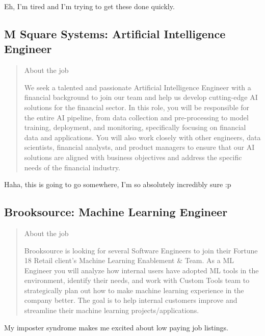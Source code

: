 \documentclass[
	letterpaper, %
	12pt, %
]{CSSullivanBusinessReport}
\begin{document}
Eh, I'm tired and I'm trying to get these done quickly.  


\subsection[M Square Systems]{M Square Systems: Artificial Intelligence Engineer}

\begin{quote}
	About the job
	
	We seek a talented and passionate Artificial Intelligence Engineer with a financial background to join our team and help us develop cutting-edge AI solutions for the financial sector. In this role, you will be responsible for the entire AI pipeline, from data collection and pre-processing to model training, deployment, and monitoring, specifically focusing on financial data and applications. You will also work closely with other engineers, data scientists, financial analysts, and product managers to ensure that our AI solutions are aligned with business objectives and address the specific needs of the financial industry.

\end{quote}

Haha, this is going to go somewhere, I'm so absolutely incredibly sure :p 


\subsection[Brooksource]{Brooksource: Machine Learning Engineer}

\begin{quote}
	About the job
	
	Brooksource is looking for several Software Engineers to join their Fortune 18 Retail client's Machine Learning Enablement \& Team. As a ML Engineer you will analyze how internal users have adopted ML tools in the environment, identify their needs, and work with Custom Tools team to strategically plan out how to make machine learning experience in the company better. The goal is to help internal customers improve and streamline their machine learning projects/applications. 

\end{quote}

My imposter syndrome makes me excited about low paying job listings.  

\end{document}
